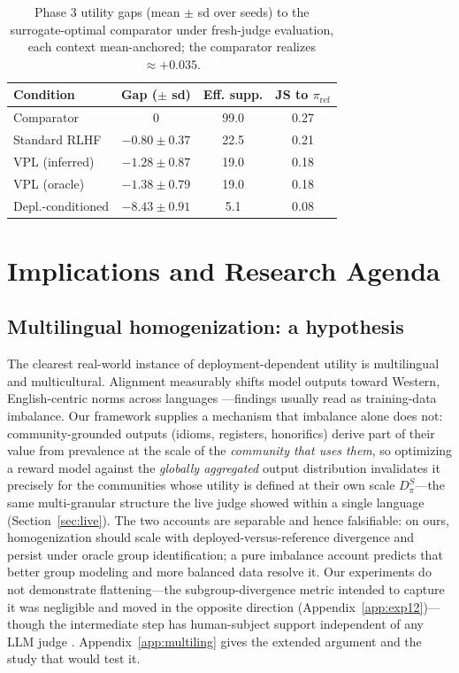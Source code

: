 ﻿\documentclass[11pt]{article}
\begin{document}
\begin{table}[t]
\centering
\footnotesize
\setlength{\tabcolsep}{3pt}
\begin{tabular}{@{}lccc@{}}
\toprule
Condition & Gap ($\pm$ sd) & Eff. supp. & JS to \(\pi_{\text{ref}}\) \\
\midrule
Comparator & \(0\) & 99.0 & 0.27 \\
Standard RLHF & \(-0.80 \pm 0.37\) & 22.5 & 0.21 \\
VPL (inferred) & \(-1.28 \pm 0.87\) & 19.0 & 0.18 \\
VPL (oracle) & \(-1.38 \pm 0.79\) & 19.0 & 0.18 \\
Depl.-conditioned & \(-8.43 \pm 0.91\) & 5.1 & 0.08 \\
\bottomrule
\end{tabular}
\caption{Phase 3 utility gaps (mean \(\pm\) sd over seeds) to the surrogate-optimal comparator under fresh-judge evaluation, each context mean-anchored; the comparator realizes \(\approx +0.035\).}
\label{tab:phase3-gaps}
\end{table}

\section{Implications and Research Agenda}
\label{sec:agenda}

\subsection{Multilingual homogenization: a hypothesis}
\label{sec:multiling}

The clearest real-world instance of deployment-dependent utility is multilingual and multicultural. Alignment measurably shifts model outputs toward Western, English-centric norms across languages \citep{ryan2024, naous2024}---findings usually read as training-data imbalance. Our framework supplies a mechanism that imbalance alone does not: community-grounded outputs (idioms, registers, honorifics) derive part of their value from prevalence at the scale of the \emph{community that uses them}, so optimizing a reward model against the \emph{globally aggregated} output distribution invalidates it precisely for the communities whose utility is defined at their own scale $D_\pi^S$---the same multi-granular structure the live judge showed within a single language (Section~\ref{sec:live}). The two accounts are separable and hence falsifiable: on ours, homogenization should scale with deployed-versus-reference divergence and persist under oracle group identification; a pure imbalance account predicts that better group modeling and more balanced data resolve it. Our experiments do not demonstrate flattening---the subgroup-divergence metric intended to capture it was negligible and moved in the opposite direction (Appendix~\ref{app:exp12})---though the intermediate step has human-subject support independent of any LLM judge \citep{doshi2024, padmakumar2024}. Appendix~\ref{app:multiling} gives the extended argument and the study that would test it.
\end{document}
